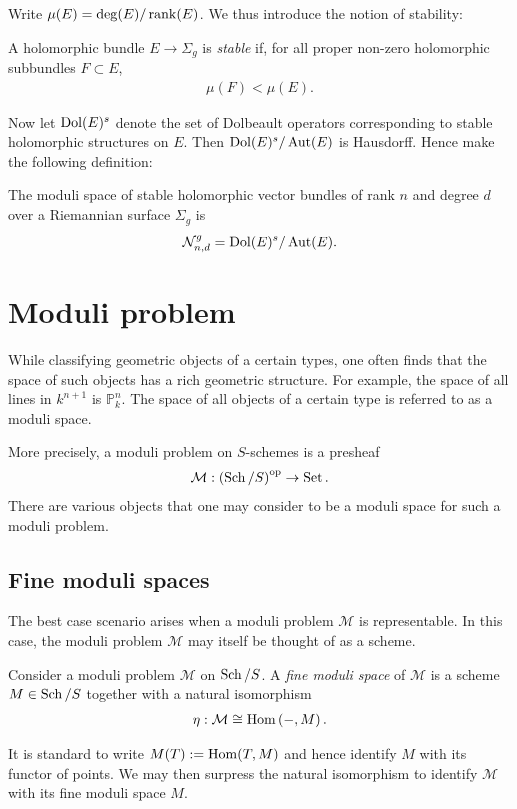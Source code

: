 \documentclass{article}
\begin{document}
Write $\mu(E) = \deg(E)/\operatorname{rank}(E)$. We thus introduce the notion of
stability:

\begin{definition}
  A holomorphic bundle $E\to\Sigma_g$ is \emph{stable} if,
  for all proper non-zero holomorphic subbundles $F\subset E$,
  \begin{align*}
    \mu(F) < \mu(E).
  \end{align*}
\end{definition}

Now let $\operatorname{Dol}(E)^s$ denote the set of Dolbeault operators corresponding
to stable holomorphic structures on $E$. Then $\operatorname{Dol}(E)^s/\operatorname{Aut}(E)$
is Hausdorff. Hence make the following definition:

\begin{definition}
  The moduli space of stable holomorphic vector bundles of rank $n$
  and degree $d$ over a Riemannian surface $\Sigma_g$ is
  \begin{align*}
    \mathcal N^g_{n,d} = \operatorname{Dol}(E)^s / \operatorname{Aut}(E).
  \end{align*}
\end{definition}

\section{Moduli problem}

While classifying geometric objects of a certain types, one often
finds that the space of such objects has a rich geometric structure.
For example, the space of all lines in $k^{n+1}$ is
$\mathbb{P}^n_k$. The space of all objects of a certain type is
referred to as a moduli space. \cite{bejleri2020}

More precisely, a moduli problem on $S$-schemes is a presheaf
\begin{align*}
  \mathcal M : {(\operatorname{Sch} / S)}^{\text{op}} \to \operatorname{Set}.
\end{align*}
There are various objects that one may consider to be a moduli
space for such a moduli problem.

\subsection{Fine moduli spaces}

The best case scenario arises when a moduli problem $\mathcal M$
is representable. In this case, the moduli problem $\mathcal M$
may itself be thought of as a scheme.

\begin{definition}
  Consider a moduli problem $\mathcal M$ on $\operatorname{Sch}/S$.
  A \emph{fine moduli space} of $\mathcal M$ is a scheme $M\in\operatorname{Sch}/S$
  together with a natural isomorphism
  \begin{align*}
    \eta : \mathcal M \cong \operatorname{Hom}\left({-,M}\right).
  \end{align*}
\end{definition}
It is standard to write $M(T) := \operatorname{Hom}(T,M)$ and hence identify
$M$ with its functor of points. We may then surpress the natural
isomorphism to identify $\mathcal M$ with its fine moduli space $M$.
\end{document}
